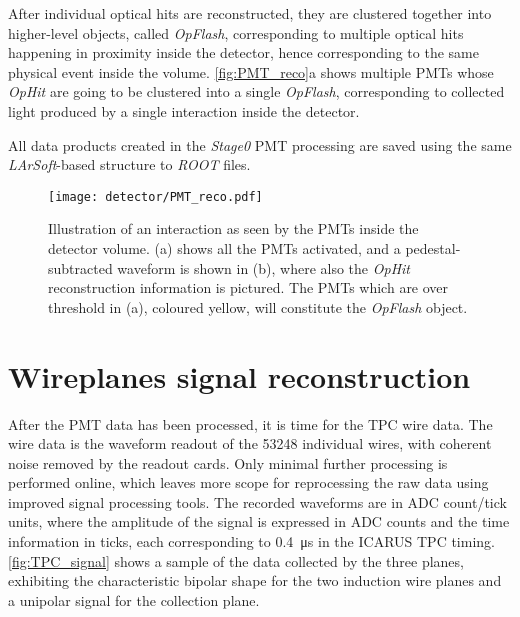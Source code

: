After individual optical hits are reconstructed, they are clustered together into higher-level objects, called \emph{OpFlash}, corresponding to multiple optical hits happening in proximity inside the detector, hence corresponding to the same physical event inside the volume. \autoref{fig:PMT_reco}a shows multiple PMTs whose \emph{OpHit} are going to be clustered into a single \emph{OpFlash}, corresponding to collected light produced by a single interaction inside the detector. 

All data products created in the \emph{Stage0} PMT processing are saved using the same \emph{LArSoft}-based structure to \emph{ROOT} \cite{rene_brun_2019_3895860} files. 

\begin{figure}
    \centering
    \texttt{[image: detector/PMT\_reco.pdf]}
    \caption[PMT reconstructed \emph{OpHits}]{Illustration of an interaction as seen by the PMTs inside the detector volume. (a) shows all the PMTs activated, and a pedestal-subtracted waveform is shown in (b), where also the \emph{OpHit} reconstruction information is pictured. The PMTs which are over threshold in (a), coloured yellow, will constitute the \emph{OpFlash} object.}
    \label{fig:PMT_reco}
\end{figure}

\section{Wireplanes signal reconstruction}

After the PMT data has been processed, it is time for the TPC wire data. The wire data is the waveform readout of the \num{53248} individual wires, with coherent noise removed by the readout cards. Only minimal further processing is performed online, which leaves more scope for reprocessing the raw data using improved signal processing tools. The recorded waveforms are in ADC count/tick units, where the amplitude of the signal is expressed in ADC counts and the time information in ticks, each corresponding to \SI{0.4}{\us} in the ICARUS TPC timing. \autoref{fig:TPC_signal} shows a sample of the data collected by the three planes, exhibiting the characteristic bipolar shape for the two induction wire planes and a unipolar signal for the collection plane. 

